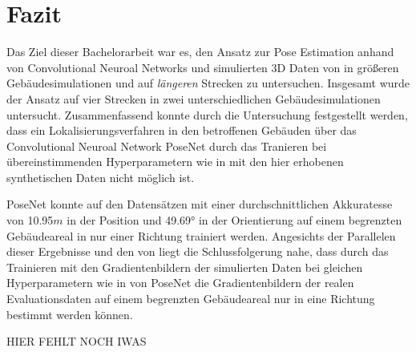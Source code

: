 
\section{Fazit}
\label{sec:kapitel_6}
Das Ziel dieser Bachelorarbeit war es, den Ansatz zur Pose Estimation anhand von Convolutional Neuroal Networks und simulierten 3D Daten von \citet{acharyaBIMPoseNetIndoorCamera2019} in größeren Gebäudesimulationen und auf \textit{längeren} Strecken zu untersuchen.
Insgesamt wurde der Ansatz auf vier Strecken in zwei unterschiedlichen Gebäudesimulationen untersucht. Zusammenfassend konnte durch die Untersuchung festgestellt werden, dass ein Lokalisierungsverfahren in den betroffenen Gebäuden über das Convolutional Neuroal Network PoseNet durch das Tranieren bei übereinstimmenden Hyperparametern wie in \cite{acharyaBIMPoseNetIndoorCamera2019} mit den hier erhobenen synthetischen Daten nicht möglich ist. 

PoseNet konnte auf den Datensätzen mit einer durchschnittlichen Akkuratesse von 10.95$m$ in der Position und 49.69° in der Orientierung auf einem begrenzten Gebäudeareal in nur einer Richtung trainiert werden. Angesichts der Parallelen dieser Ergebnisse und den von \citet{acharyaBIMPoseNetIndoorCamera2019} liegt die Schlussfolgerung nahe, dass durch das Trainieren mit den Gradientenbildern der simulierten Daten bei gleichen Hyperparametern wie in \cite{acharyaBIMPoseNetIndoorCamera2019} von PoseNet die Gradientenbildern der realen Evaluationsdaten auf einem begrenzten Gebäudeareal nur in eine Richtung bestimmt werden können.

HIER FEHLT NOCH IWAS